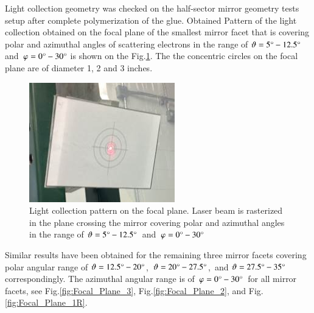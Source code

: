 \indent Light collection geometry was checked on the half-sector mirror geometry tests setup after complete polymerization of the glue. Obtained Pattern of the light collection obtained on the focal plane of the smallest mirror facet that is covering polar and azimuthal angles of scattering electrons in the range of $\vartheta = 5\degree - 12.5\degree$\, and\, $\varphi = 0\degree - 30\degree$ is shown on the Fig.\ref{fig:Focal_Plane_4}. The the concentric circles on the focal plane are of diameter 1, 2 and 3 inches.  

\begin{figure}[h]
    \centering
    \includegraphics[width=0.90\linewidth]{images/Focal_Plane_4.jpg}
    \caption{Light collection pattern on the focal plane. Laser beam is rasterized in the plane crossing the mirror covering polar and azimuthal angles in the range of $\vartheta = 5\degree - 12.5\degree$\, and\, $\varphi = 0\degree - 30\degree$}
    \label{fig:Focal_Plane_4}
\end{figure}

Similar results have been obtained for the remaining three mirror facets covering polar angular range of $\vartheta = 12.5\degree - 20\degree$,\, $\vartheta = 20\degree - 27.5\degree$,\, and $\vartheta = 27.5\degree - 35\degree$\, correspondingly. The azimuthal angular range is of\, $\varphi = 0\degree - 30\degree$\, for all mirror facets, see Fig.\ref{fig:Focal_Plane_3}, Fig.\ref{fig:Focal_Plane_2}, and Fig.\ref{fig:Focal_Plane_1R}.

